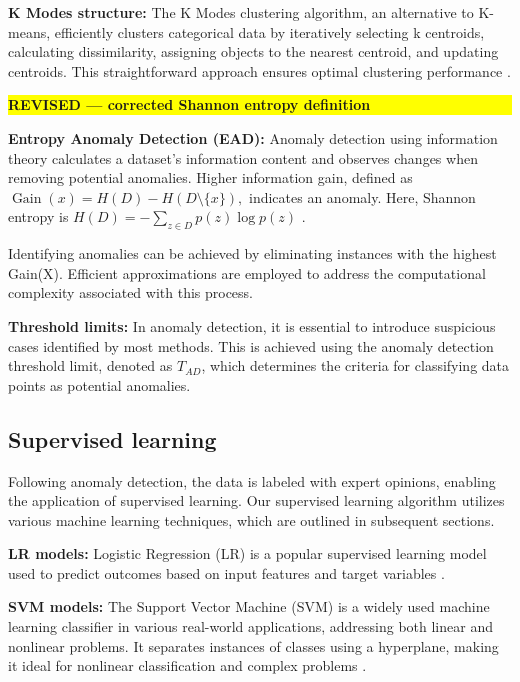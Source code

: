 \documentclass[12pt]{article}
\newcommand{\revmark}[1]{\par\noindent\colorbox{yellow}{%
  \parbox{\dimexpr\linewidth-2\fboxsep}{\raggedright\strut\textbf{#1}}}%
  \par\smallskip}
\begin{document}
\textbf{\small K Modes structure:} The K Modes clustering
algorithm, an alternative to K-means, efficiently clusters
categorical data by iteratively selecting k centroids, calculating
dissimilarity, assigning objects to the nearest centroid, and
updating centroids. This straightforward approach ensures optimal
clustering performance \cite{A60}.

\revmark{REVISED --- corrected Shannon entropy definition}
\textbf{\small Entropy Anomaly Detection (EAD):} Anomaly detection
using information theory calculates a dataset's information
content and observes changes when removing potential anomalies.
Higher information gain, defined as $\operatorname{Gain}(x) =
H(D)-H(D\setminus\{x\}),$ indicates an anomaly. Here, Shannon entropy is
$H(D)=-\sum_{z\in D}p(z)\log p(z)$
\cite{A57}.

Identifying anomalies can be achieved by eliminating instances
with the highest Gain(X). Efficient approximations are employed to
address the computational complexity associated with this process.

\textbf{\small Threshold limits:} In anomaly detection, it is
essential to introduce suspicious cases identified by most
methods. This is achieved using the anomaly detection threshold
limit, denoted as $T_{AD}$, which determines the criteria for
classifying data points as potential anomalies.


\subsection{Supervised learning}\label{SSC:ML}
Following anomaly detection, the data is labeled with expert
opinions, enabling the application of supervised learning. Our
supervised learning algorithm utilizes various machine learning
techniques, which are outlined in subsequent sections.

\textbf{\small LR models:} Logistic Regression (LR) is a popular
supervised learning model used to predict outcomes based on input
features and target variables \cite{A52}.

\textbf{\small SVM models:} The Support Vector Machine (SVM) is a
widely used machine learning classifier in various real-world
applications, addressing both linear and nonlinear problems. It
separates instances of classes using a hyperplane, making it ideal
for nonlinear classification and complex problems \cite{A52}.
\end{document}
